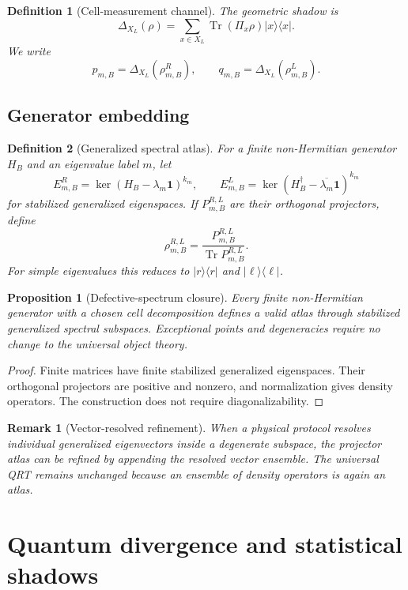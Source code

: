 \documentclass[11pt]{article}
\newtheorem{definition}{Definition}
\newtheorem{proposition}{Proposition}
\newtheorem{remark}{Remark}
\newcommand{\Tr}{\operatorname{Tr}}
\newcommand{\id}{\mathbf 1}
\begin{document}
\begin{definition}[Cell-measurement channel]
The geometric shadow is
\[
\Delta_{X_L}(\rho)
=\sum_{x\in X_L}\Tr(\Pi_x\rho)|x\rangle\langle x|.
\]
We write
\[
p_{m,B}=\Delta_{X_L}(\rho_{m,B}^R),
\qquad
q_{m,B}=\Delta_{X_L}(\rho_{m,B}^L).
\]
\end{definition}

\subsection{Generator embedding}

\begin{definition}[Generalized spectral atlas]
For a finite non-Hermitian generator $H_B$ and an eigenvalue label $m$, let
\[
E_{m,B}^{R}=\ker(H_B-\lambda_m\id)^{k_m},
\qquad
E_{m,B}^{L}=\ker(H_B^\dagger-\overline{\lambda_m}\id)^{k_m}
\]
for stabilized generalized eigenspaces. If $P_{m,B}^{R,L}$ are their orthogonal projectors, define
\[
\rho_{m,B}^{R,L}
=\frac{P_{m,B}^{R,L}}{\Tr P_{m,B}^{R,L}}.
\]
For simple eigenvalues this reduces to $|r\rangle\langle r|$ and $|\ell\rangle\langle\ell|$.
\end{definition}

\begin{proposition}[Defective-spectrum closure]
Every finite non-Hermitian generator with a chosen cell decomposition defines a valid atlas through stabilized generalized spectral subspaces. Exceptional points and degeneracies require no change to the universal object theory.
\end{proposition}

\begin{proof}
Finite matrices have finite stabilized generalized eigenspaces. Their orthogonal projectors are positive and nonzero, and normalization gives density operators. The construction does not require diagonalizability.
\end{proof}

\begin{remark}[Vector-resolved refinement]
When a physical protocol resolves individual generalized eigenvectors inside a degenerate subspace, the projector atlas can be refined by appending the resolved vector ensemble. The universal QRT remains unchanged because an ensemble of density operators is again an atlas.
\end{remark}

\section{Quantum divergence and statistical shadows}
\end{document}

